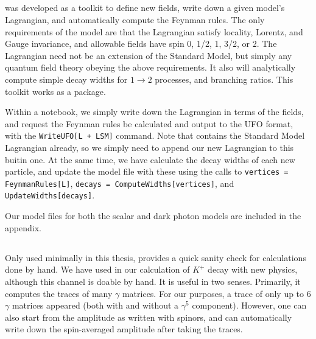 \subsection{\feynrules}
\feynrules was developed as a toolkit to define new fields, write down a given model's Lagrangian, and automatically compute the Feynman rules.
The only requirements of the model are that the Lagrangian satisfy locality, Lorentz, and Gauge invariance, and allowable fields have spin 0, 1/2, 1, 3/2, or 2. The Lagrangian need not be an extension of the Standard Model, but simply any quantum field theory obeying the above requirements. 
It also will analytically compute simple decay widths for $1 \rightarrow 2$ processes, and branching ratios.
This toolkit works as a \mathematica package.

Within a \mathematica notebook, we simply write down the Lagrangian in terms of the fields, and request the Feynman rules be calculated and output to the UFO format, with the \texttt{WriteUFO[L + LSM]} command. Note that \feynrules contains the Standard Model Lagrangian already, so we simply need to append our new Lagrangian to this buitin one.
At the same time, we have \feynrules calculate the decay widths of each new particle, and update the model file with these using the calls to \texttt{vertices = FeynmanRules[L]}, \texttt{decays = ComputeWidths[vertices]}, and \texttt{UpdateWidths[decays]}.

Our model files for both the scalar and dark photon models are included in the appendix. 

\subsection{\feyncalc}
Only used minimally in this thesis, \feyncalc provides a quick sanity check for calculations done by hand.
We have used \feyncalc in our calculation of $K^+$ decay with new physics, although this channel is doable by hand.
It is useful in two senses. Primarily, it computes the traces of many $\gamma$ matrices.
For our purposes, a trace of only up to 6 $\gamma$ matrices appeared (both with and without a $\gamma^5$ component).
However, one can also start from the amplitude as written with spinors, and \feyncalc can automatically write down the spin-averaged amplitude after taking the traces.

